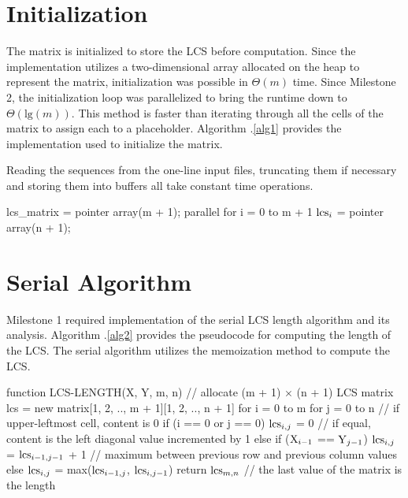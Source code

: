 \documentclass[usletter, 11pt]{extarticle}
\newcommand{\V}[1]{\textup{#1}}
\newcommand{\lcs}{\V{lcs}}
\newcommand{\seqone}{\V{X}}
\newcommand{\seqtwo}{\V{Y}}
\begin{document}
    \section{Initialization} The matrix is initialized to store the LCS before
    computation. Since the implementation utilizes a two-dimensional array
    allocated on the heap to represent the matrix, initialization was possible
    in $\Theta(m)$ time. Since Milestone 2, the initialization loop was
    parallelized to bring the runtime down to $\Theta(\text{lg}(m))$. This
    method is faster than iterating through all the cells of the matrix to
    assign each to a placeholder. Algorithm \thesection .\ref{alg1} provides
    the implementation used to initialize the matrix.

    Reading the sequences from the one-line input files, truncating them if
    necessary and storing them into buffers all take constant time operations.
    \newpage

\begin{pseudocode}[caption={Initialization of the Longest Common Subsequence
Matrix}, label={alg1}]
lcs_matrix = pointer array(m + 1);
parallel for i = 0 to m + 1
    $\lcs_{i}$ = pointer array(n + 1);

\end{pseudocode}

    \section{Serial Algorithm} Milestone 1 required implementation of the
    serial LCS length algorithm and its analysis. Algorithm \thesection
    .\ref{alg2} provides the pseudocode for computing the length of the LCS.
    The serial algorithm utilizes the memoization method to compute the LCS.

\begin{pseudocode}[caption={Serial Longest Common Subsequence Length},
label={alg2}]
function LCS-LENGTH(X, Y, m, n)
    // allocate (m + 1) $\times$ (n + 1) LCS matrix
    lcs = new matrix[1, 2, .., m + 1][1, 2, .., n + 1]
    for i = 0 to m
        for j = 0 to n
            // if upper-leftmost cell, content is 0
            if (i == 0 or j == 0)
                $\lcs_{i, j}$ = 0
            // if equal, content is the left diagonal value incremented by 1
            else if ($\seqone_{i - 1}$ == $\seqtwo_{j - 1}$)
                $\lcs_{i, j}$ = $\lcs_{i-1, j-1}$ + 1  
            // maximum between previous row and previous column values
            else
                $\lcs_{i, j}$ = max($\lcs_{i-1, j}$, $\lcs_{i, j-1}$)
    return $\lcs_{m,n}$  // the last value of the matrix is the length

\end{pseudocode}
\end{document}
